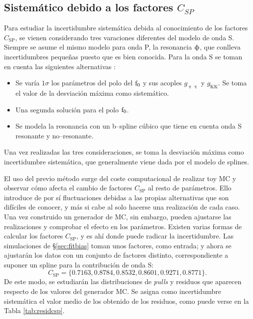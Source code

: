 \subsection{Sistemático debido a los factores \texorpdfstring{$C_{SP}$}{CSP}}


Para estudiar la incertidumbre sistemática debida al conocimiento de los factores $C_{\text{SP}}$, se vienen considerando tres varaciones diferentes del modelo de onda S. Siempre se asume el mismo modelo para onda P, la resonancia $\upphi$, que conlleva incertidumbres pequeñas puesto que es bien conocida. Para la onda S se toman en cuenta las siguientes alternativas \cite{paperPhis}:
\begin{itemize}
  \item Se varía $1 \sigma$ los parámetros del polo del $\text{f}_0$ y sus acoples $g_{\uppi \uppi}$ y $g_{\text{KK}}$. Se toma el valor de la desviación máxima como sistemático.
  \item Una segunda solución para el polo $\text{f}_0$.
  \item Se modela la resonancia con un b--spline cúbico que tiene en cuenta onda S resonante y no--resonante.
\end{itemize}
Una vez realizadas las tres consideraciones, se toma la desviación máxima como incertidumbre sistemática, que generalmente viene dada por el modelo de splines.

El uso del previo método surge del coste computacional de realizar toy MC y observar cómo afecta el cambio de factores $C_{\text{SP}}$ al resto de parámetros. Ello introduce de por sí fluctuaciones debidas a las propias alternativas que son difíciles de conocer, y más si cabe al solo hacerse una realización de cada caso. Una vez construido un generador de MC, sin embargo, pueden ajustarse las realizaciones y comprobar el efecto en los parámetros.
Existen varias formas de calcular los factores $C_{\text{SP}}$, y es ahí donde puede radicar la incertidumbre. Las simulaciones de \S \ref{sec:fitbias} toman unos factores, como entrada; y ahora se ajustarán los datos con un conjunto de factores distinto, correspondiente a suponer un spline para la contribución de onda S:
\[C_{\text{SP}} = \{0.7163, 0.8784, 0.8532, 0.8601, 0.9271, 0.8771 \}.\]
De este modo, se estudiarán las distribuciones de \textit{pulls} y residuos que aparecen respecto de los valores del generador MC. Se asigna como incertidumbre sistemática el valor medio de los obtenido de los residuos, como puede verse en la Tabla \ref{tab:residcsp}.


